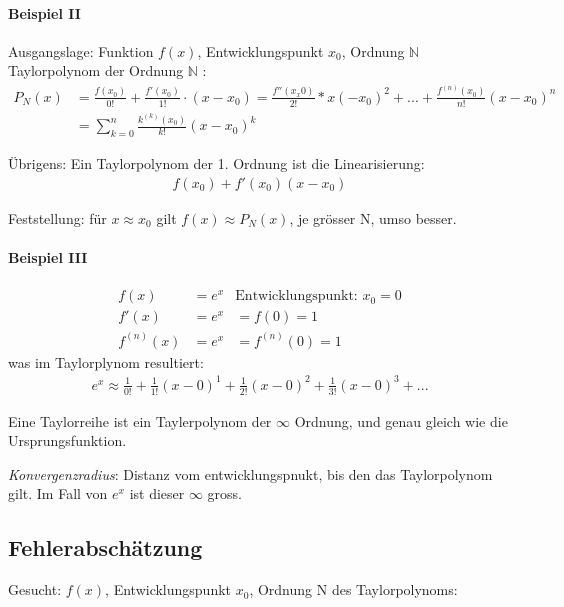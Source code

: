 \paragraph{Beispiel II}

Ausgangslage: Funktion $f(x)$, Entwicklungspunkt $x_0$, Ordnung $\mathbb{N}$ \hfill \\

Taylorpolynom der Ordnung $\mathbb{N}$ : 
\begin{align*}
P_N(x) &= \frac{f(x_0)}{0!} + \frac{f'(x_0)}{1!} \cdot (x - x_0) = \frac{f''(x_x0)}{2!} * x(-x_0)^2 + ... + \frac{f^(n)(x_0)}{n!} (x-x_0)^n \\
&= \sum^n_{k=0}{\frac{k^{(k)}(x_0)}{k!} (x-x_0)^k}
\end{align*}

Übrigens: Ein Taylorpolynom der 1. Ordnung ist die Linearisierung:
\begin{align*}
	f(x_0) + f'(x_0)(x-x_0)
\end{align*}

Feststellung: für $x \approx x_0$ gilt $f(x) \approx P_N(x)$, je grösser N, umso besser.


\paragraph{Beispiel III}

\begin{align*}
	f(x) &= e^x & \text{Entwicklungspunkt: } x_0=0 \\
	f'(x) &= e^x &= f(0) = 1\\
	f^{(n)}(x) &= e^x &= f^{(n)}(0) = 1
\end{align*}
was im Taylorplynom resultiert:
\begin{align*}
e^x \approx \frac{1}{0!} + \frac{1}{1!}(x-0)^1 + \frac{1}{2!}(x-0)^2 + \frac{1}{3!}(x-0)^3 + ...
\end{align*}

Eine Taylorreihe ist ein Taylerpolynom der $\infty$ Ordnung, und genau gleich wie die Ursprungsfunktion.

\emph{Konvergenzradius}: Distanz vom entwicklungspnukt, bis den das Taylorpolynom gilt. Im Fall von $e^x$ ist dieser $\infty$ gross.

\subsection{Fehlerabschätzung}

Gesucht: $f(x)$, Entwicklungspunkt $x_0$, Ordnung N des Taylorpolynoms:

